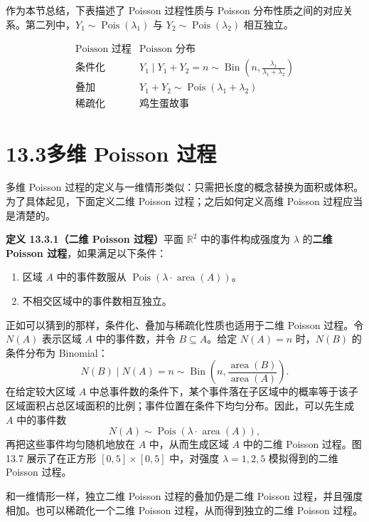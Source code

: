 \documentclass[UTF8, 12pt, fontset=fandol, oneside]{ctexart}
\begin{document}
作为本节总结，下表描述了 Poisson 过程性质与 Poisson 分布性质之间的对应关系。第二列中，$Y_1\sim\operatorname{Pois}(\lambda_1)$ 与 $Y_2\sim\operatorname{Pois}(\lambda_2)$ 相互独立。

\[
\begin{array}{c|c}
\text{Poisson 过程} & \text{Poisson 分布}\\
\hline
\text{条件化} &
Y_1\mid Y_1+Y_2=n\sim
\operatorname{Bin}\left(n,\frac{\lambda_1}{\lambda_1+\lambda_2}\right)\\
\text{叠加} & Y_1+Y_2\sim\operatorname{Pois}(\lambda_1+\lambda_2)\\
\text{稀疏化} & \text{鸡生蛋故事}
\end{array}
\]

\section*{13.3\quad 多维 Poisson 过程}

多维 Poisson 过程的定义与一维情形类似：只需把长度的概念替换为面积或体积。为了具体起见，下面定义二维 Poisson 过程；之后如何定义高维 Poisson 过程应当是清楚的。

\noindent\textbf{定义 13.3.1（二维 Poisson 过程）}\quad 平面 $\mathbb R^2$ 中的事件构成强度为 $\lambda$ 的\textbf{二维 Poisson 过程}，如果满足以下条件：
\begin{enumerate}
  \item 区域 $A$ 中的事件数服从 $\operatorname{Pois}(\lambda\cdot\operatorname{area}(A))$。
  \item 不相交区域中的事件数相互独立。
\end{enumerate}

正如可以猜到的那样，条件化、叠加与稀疏化性质也适用于二维 Poisson 过程。令 $N(A)$ 表示区域 $A$ 中的事件数，并令 $B\subseteq A$。给定 $N(A)=n$ 时，$N(B)$ 的条件分布为 Binomial：
\[
  N(B)\mid N(A)=n
  \sim
  \operatorname{Bin}\left(n,\frac{\operatorname{area}(B)}{\operatorname{area}(A)}\right).
\]
在给定较大区域 $A$ 中总事件数的条件下，某个事件落在子区域中的概率等于该子区域面积占总区域面积的比例；事件位置在条件下均匀分布。因此，可以先生成 $A$ 中的事件数
\[
  N(A)\sim\operatorname{Pois}(\lambda\cdot\operatorname{area}(A)),
\]
再把这些事件均匀随机地放在 $A$ 中，从而生成区域 $A$ 中的二维 Poisson 过程。图 13.7 展示了在正方形 $[0,5]\times[0,5]$ 中，对强度 $\lambda=1,2,5$ 模拟得到的二维 Poisson 过程。

和一维情形一样，独立二维 Poisson 过程的叠加仍是二维 Poisson 过程，并且强度相加。也可以稀疏化一个二维 Poisson 过程，从而得到独立的二维 Poisson 过程。
\end{document}
